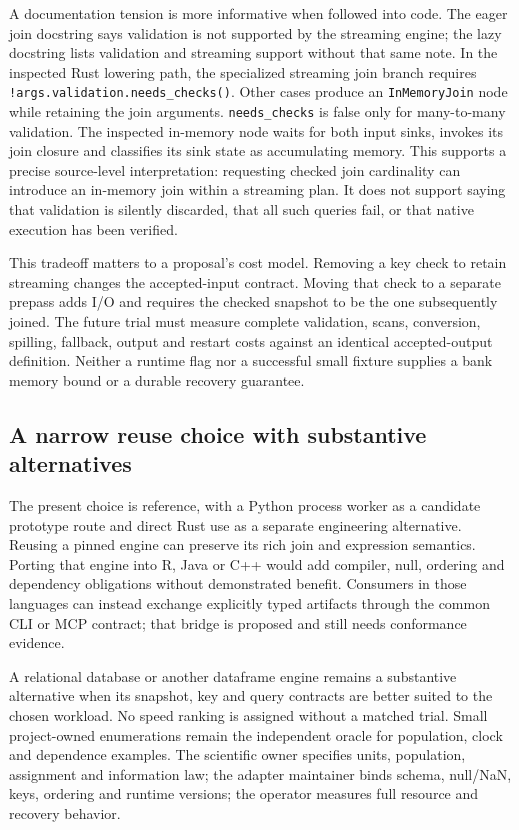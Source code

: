 A documentation tension is more informative when followed into code.
The eager join docstring says validation is not supported by the
streaming engine; the lazy docstring lists validation and streaming
support without that same note. In the inspected Rust lowering path,
the specialized streaming join branch requires
\texttt{!args.validation.needs\_checks()}. Other cases produce an
\texttt{InMemoryJoin} node while retaining the join arguments.
\texttt{needs\_checks} is false only for many-to-many validation.
The inspected in-memory node waits for both input sinks, invokes its
join closure and classifies its sink state as accumulating memory.
This supports a precise source-level interpretation: requesting checked
join cardinality can introduce an in-memory join within a streaming
plan. It does not support saying that validation is silently discarded,
that all such queries fail, or that native execution has been verified.
\citep{exec23_polars_sources}

This tradeoff matters to a proposal's cost model. Removing a key check to
retain streaming changes the accepted-input contract. Moving that check
to a separate prepass adds I/O and requires the checked snapshot to be
the one subsequently joined. The future trial must measure complete
validation, scans, conversion, spilling, fallback, output and restart
costs against an identical accepted-output definition. Neither a runtime
flag nor a successful small fixture supplies a bank memory bound or a
durable recovery guarantee.

\subsection{A narrow reuse choice with substantive alternatives}

The present choice is reference, with a Python process worker as a
candidate prototype route and direct Rust use as a separate engineering
alternative. Reusing a pinned engine can preserve its rich join and
expression semantics. Porting that engine into R, Java or C++ would add
compiler, null, ordering and dependency obligations without demonstrated
benefit. Consumers in those languages can instead exchange explicitly
typed artifacts through the common CLI or MCP contract; that bridge is
proposed and still needs conformance evidence.

A relational database or another dataframe engine remains a substantive
alternative when its snapshot, key and query contracts are better suited
to the chosen workload. No speed ranking is assigned without a matched
trial. Small project-owned enumerations remain the independent oracle
for population, clock and dependence examples. The scientific owner
specifies units, population, assignment and information law; the adapter
maintainer binds schema, null/NaN, keys, ordering and runtime versions;
the operator measures full resource and recovery behavior.

